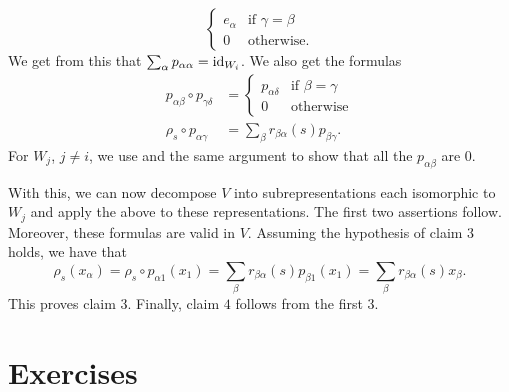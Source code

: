 \documentclass[letterpaper, 11pt, oneside]{book}
\begin{document}
\begin{prop}
\begin{pf}
\[      \begin{cases}
        e_{\alpha} & \text{if } \gamma = \beta \\
        0          & \text{otherwise.}
      \end{cases}
    \]
    We get from this that $\sum_{\alpha} p_{\alpha \alpha} = \operatorname{id}_{W_{i}}$.
    We also get the formulas
    \begin{align*}
      p_{\alpha \beta} \circ p_{\gamma \delta} &= \begin{cases} p_{\alpha \delta} & \text{if } \beta = \gamma \\ 0 & \text{otherwise} \end{cases} \\
      \rho_{s} \circ p_{\alpha \gamma} &= \sum_{\beta} r_{\beta \alpha}(s) p_{\beta \gamma}.
    \end{align*}
    For $W_{j}$, $j \neq i$, we use  and the same argument to show that all the $p_{\alpha \beta}$ are $0$.

    \clearpage

    With this, we can now decompose $V$ into subrepresentations each isomorphic to $W_{j}$ and apply the above to these representations.
    The first two assertions follow.
    Moreover, these formulas are valid in $V$.
    Assuming the hypothesis of claim $3$ holds, we have that
    \[
      \rho_{s}(x_{\alpha}) = \rho_{s} \circ p_{\alpha 1}(x_{1}) = \sum_{\beta} r_{\beta \alpha}(s) p_{\beta 1}(x_{1}) = \sum_{\beta} r_{\beta \alpha}(s) x_{\beta}.
    \]
    This proves claim $3$.
    Finally, claim $4$ follows from the first $3$.
  \end{pf}
\end{prop}

\clearpage

\section*{Exercises}
\end{document}
